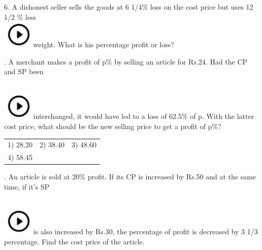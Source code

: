 \documentclass{article}
\begin{document}
	\noindent 
	
	6.   A dishonest seller sells the goods at 6 1/4\% loss on the cost price but uses 12 1/2 \% less \noindent \\ \includegraphics*[width=0.60in, height=0.52in]{images/image1}weight. What is his percentage profit or loss?
	
	\noindent 
	
	.   A merchant makes a profit of p\% by selling an article for Rs.24. Had the CP and SP been
	
	\noindent 
	
	\noindent \noindent \\ \includegraphics*[width=0.60in, height=0.52in]{images/image1}interchanged, it would have led to a loss of 62.5\% of p. With the latter cost price, what should be the new selling price to get a profit of p\%?
	
	\noindent 
	
	\noindent  
	\begin{tabular}{p{1.7in} p{1.6in} p{1.6in}} \\ 
 1) 28.20                   & 2) 38.40            & 3) 48.60            \\
4) 58.45 \\
\end{tabular}
	\noindent 
	
	\noindent 
	
	.   An article is sold at 20\% profit. If its CP is increased by Rs.50 and at the same time, if it's SP
	
	\noindent \noindent \\ \includegraphics*[width=0.60in, height=0.52in]{images/image1}is also increased by Rs.30, the percentage of profit is decreased by 3 1/3 percentage. Find the cost price of the article.
	
	\noindent 
	
	\noindent 
	
	\noindent 
	
\end{document}
